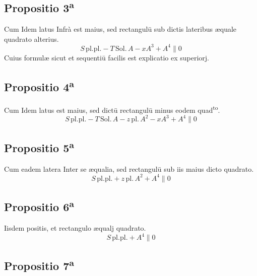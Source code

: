 \documentclass[11pt,a4paper]{article}
\begin{document}
\subsection*{Propositio 3\textsuperscript{a}}

Cum Idem latus Infrà est maius, sed rectangulū sub dictis lateribus æquale quadrato alterius.
\[ S\,\mathrm{pl.pl.} - T\,\mathrm{Sol.}\,A - xA^{3} + A^{4} \parallel 0 \]
Cuius formulæ  sicut et sequentiū facilis est explicatio ex superiorj.


\subsection*{Propositio 4\textsuperscript{a}}

Cum Idem latus est maius, sed dictū rectangulū minus eodem quad\textsuperscript{to}.
\[ S\,\mathrm{pl.pl.} - T\,\mathrm{Sol.}\,A - z\,\mathrm{pl.}\,A^{2} - xA^{3} + A^{4} \parallel 0 \]

\subsection*{Propositio 5\textsuperscript{a}}

Cum eadem latera Inter se æqualia, sed rectangulū sub iis maius dicto quadrato.
\[ S\,\mathrm{pl.pl.} + z\,\mathrm{pl.}\,A^{2} + A^{4} \parallel 0 \]

\subsection*{Propositio 6\textsuperscript{a}}

Iisdem positis, et rectangulo æqualj quadrato.
\[ S\,\mathrm{pl.pl.} + A^{4} \parallel 0 \]

\subsection*{Propositio 7\textsuperscript{a}}
\end{document}
